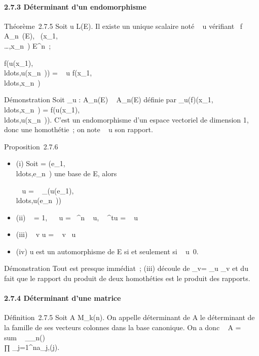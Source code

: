 \documentclass[]{article}
\begin{document}
\paragraph{2.7.3 Déterminant d'un endomorphisme}

Théorème~2.7.5 Soit u \in L(E). Il existe un unique scalaire noté
~ u vérifiant
\forall~f \in A_n~(E),
\forall~(x_1,\\\ldots,x_n~)
\in E^n~;

f(u(x_1),\\ldots,u(x_n~))
= ~ u
f(x_1,\\ldots,x_n~)

Démonstration Soit \phi_u : A_n(E) \rightarrow~ A_n(E)
définie par
\phi_u(f)(x_1,\\ldots,x_n~)
=
f(u(x_1),\\ldots,u(x_n~)).
C'est un endomorphisme d'un espace vectoriel de dimension 1, donc une
homothétie~; on note
~ u son rapport.

Proposition~2.7.6

\begin{itemize}
\item
  (i) Soit  =
  (e_1,\\ldots,e_n~)
  une base de E, alors

  ~ u
  = ~
  _(u(e_1),\\ldots,u(e_n~))
\item
  (ii) ~
  \mathrmId = 1,
  ~ \lambda~u =
  \lambda~^n ~
  u, ~
  ^tu = ~
  u
\item
  (iii) ~ v \cdot u
  = ~
  v~ u
\item
  (iv) u est un automorphisme de E si et seulement si
  ~
  u\neq~0.
\end{itemize}

Démonstration Tout est presque immédiat~; (iii) découle de
\phi_v\cdotu = \phi_u \cdot \phi_v et du fait que le rapport
du produit de deux homothéties est le produit des rapports.

\paragraph{2.7.4 Déterminant d'une matrice}

Définition~2.7.5 Soit A \in M_k(n). On appelle déterminant de A
le déterminant de la famille de ses vecteurs colonnes dans la base
canonique. On a donc
~ A
= \\sum ~
_\sigma\inS_n\epsilon(\sigma)\\∏
 _j=1^na_j,\sigma(j).
\end{document}
